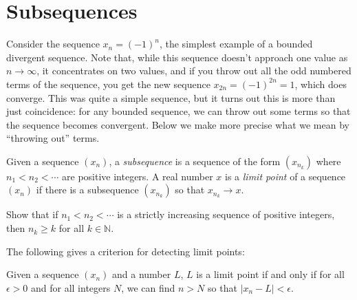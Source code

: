 \documentclass[11pt,dvipsnames]{book}
\numberwithin{figure}{section} %
\numberwithin{table}{section} %
\begin{document}
\section{Subsequences}%
\label{subsequences}

Consider the sequence $x_n=(-1)^{n}$, the simplest example of a bounded divergent sequence. Note that, while this sequence doesn't approach one value as $n\rightarrow\infty$, it concentrates on two values, and if you throw out all the odd numbered terms of the sequence, you get the new sequence $x_{2n}=(-1)^{2n}=1$, which does converge. This was quite a simple sequence, but it turns out this is more than just coincidence: for any bounded sequence, we can throw out some terms so that the sequence becomes convergent. Below we make more precise what we mean by ``throwing out'' terms.

\begin{definition}
Given a sequence $(x_{n})$, a {\it subsequence} is a sequence of the form $(x_{n_{k}})$ where $n_{1}<n_{2}<\cdots $ are positive integers. A real number $x$ is a {\it limit point} of a sequence $(x_{n})$ if there is a subsequence $(x_{n_{k}})$ so that $x_{n_{k}}\rightarrow x$.
\end{definition}

\begin{exercise}
Show that if $n_{1}<n_{2}<\cdots $ is a strictly increasing sequence of positive integers, then $n_k\geq k$ for all $k\in\mathbb{N}$.
\end{exercise}

The following gives a criterion for detecting limit points:

\begin{proposition}
\label{p:lim-points}
Given a sequence $(x_n)$ and a number $L$, $L$ is a limit point if and only if for all $\epsilon>0$ and for all integers $N$, we can find $n> N$ so that $|x_n-L|<\epsilon$.
\end{proposition}
\end{document}
